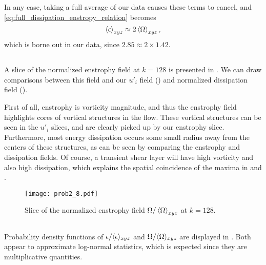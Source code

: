 \documentclass[11pt]{article}
\begin{document}
In any case, taking a full average of our data causes these terms to cancel, and \eqref{eq:full_dissipation_enstropy_relation} becomes
\begin{equation}
\left< \epsilon \right>_{xyz}
\approx
2 \left< \Omega \right>_{xyz}
,
\end{equation}
which is borne out in our data, since $2.85 \approx 2 \times 1.42$.

\subsection{}

A slice of the normalized enstrophy field at $k=128$ is presented in . We can draw comparisons between this field and our $u'_i$ field () and normalized dissipation field ().

First of all, enstrophy is vorticity magnitude, and thus the enstrophy field highlights cores of vortical structures in the flow. These vortical structures can be seen in the $u'_i$ slices, and are clearly picked up by our enstrophy slice. Furthermore, most energy dissipation occurs some small radius away from the centers of these structures, as can be seen by comparing the enstrophy and dissipation fields. Of course, a transient shear layer will have high vorticity and also high dissipation, which explains the spatial coincidence of the maxima in   and .

\begin{figure}[t]
\centering
\texttt{[image: prob2\_8.pdf]}
\\[6pt]
\caption{Slice of the normalized enstrophy field $\Omega / \left< \Omega \right>_{xyz}$ at $k=128$.}
\label{fig:prob_2_8_omega_normalized_slice}
\end{figure}

\subsection{}

Probability density functions of $\epsilon / \langle \epsilon \rangle_{xyz}$ and $\Omega / \langle \Omega \rangle_{xyz}$ are displayed in . Both appear to approximate log-normal statistics, which is expected since they are multiplicative quantities.
\end{document}
